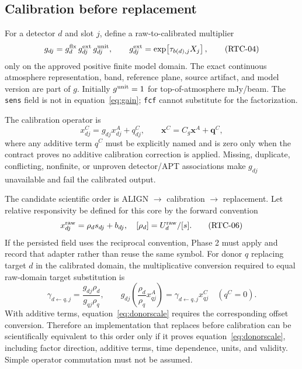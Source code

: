 \documentclass[11pt]{article}
\newcommand{\code}[1]{\nolinkurl{#1}}
\begin{document}
\subsection{Calibration before replacement}

For a detector $d$ and slot $j$, define a raw-to-calibrated multiplier
\begin{equation}
 g_{dj}=g^{\rm flx}_{d}\,
        g^{\rm ext}_{dj}\,g^{\rm unit}_{dj},\qquad
 g^{\rm ext}_{dj}=\exp\!\left[\tau_{b(d),j}X_j\right],
 \tag{RTC-04}\label{eq:gain}
\end{equation}
only on the approved positive finite model domain.  The exact continuous
atmosphere representation, band, reference plane, source artifact, and model
version are part of $g$.  Initially $g^{\rm unit}=1$ for top-of-atmosphere
mJy/beam.  The \code{sens} field is not in equation~\eqref{eq:gain}; \code{fcf}
cannot substitute for the factorization.

The calibration operator is
\begin{equation}
  x^C_{dj}=g_{dj}x^A_{dj}+q^C_{dj},
  \qquad \mathbf x^C=C_g\mathbf x^A+\mathbf q^C,
  \tag{RTC-05}\label{eq:cal}
\end{equation}
where any additive term $q^C$ must be explicitly named and is zero only when
the contract proves no additive calibration correction is applied.  Missing,
duplicate, conflicting, nonfinite, or unproven detector/APT associations make
$g_{dj}$ unavailable and fail the calibrated output.

The candidate scientific order is ALIGN $\rightarrow$ calibration
$\rightarrow$ replacement.  Let relative responsivity be defined for this
core by the forward convention
\begin{equation}
 x^{\rm raw}_{dj}=\rho_d s_{dj}+b_{dj},
 \quad [\rho_d]=U^{\rm raw}_d/[s].
 \tag{RTC-06}\label{eq:respdef}
\end{equation}
If the persisted field uses the reciprocal convention, Phase 2 must apply and
record that adapter rather than reuse the same symbol.  For donor $q$ replacing
target $d$ in the calibrated domain, the multiplicative conversion required
to equal raw-domain target substitution is
\begin{equation}
 \gamma_{d\leftarrow q,j}
   =\frac{g_{dj}\rho_d}{g_{qj}\rho_q},\qquad
 g_{dj}\left(\frac{\rho_d}{\rho_q}x^A_{qj}\right)
   =\gamma_{d\leftarrow q,j}x^C_{qj}
   \quad(q^C=0).
 \tag{RTC-07}\label{eq:donorscale}
\end{equation}
With additive terms, equation~\eqref{eq:donorscale} requires the corresponding
offset conversion.  Therefore an implementation that replaces before
calibration can be scientifically equivalent to this order only if it proves
equation~\eqref{eq:donorscale}, including factor direction, additive terms,
time dependence, units, and validity.  Simple operator commutation must not be
assumed.
\end{document}
